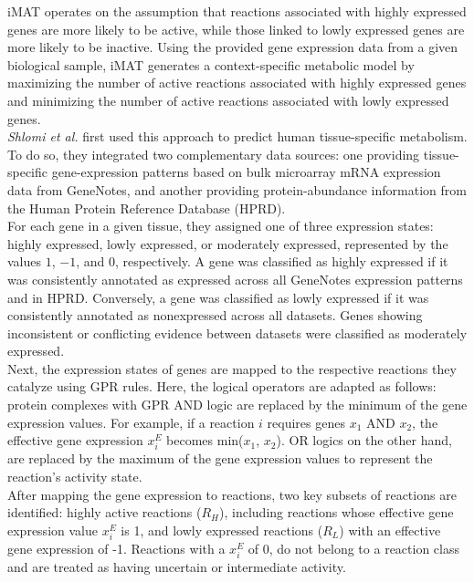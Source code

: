 iMAT operates on the assumption that reactions associated with highly expressed genes are more likely to be active, while those linked to lowly expressed genes are more likely to be inactive. Using the provided gene expression data from a given biological sample, iMAT generates a context-specific metabolic model by maximizing the number of active reactions associated with highly expressed genes and minimizing the number of active reactions associated with lowly expressed genes.
\\

\textit{Shlomi et al.} first used this approach to predict human tissue-specific metabolism. To do so, they integrated two complementary data sources: one providing tissue-specific gene-expression patterns based on bulk microarray mRNA expression data from GeneNotes, and another providing protein-abundance information from the Human Protein Reference Database (HPRD). 
\\
For each gene in a given tissue, they assigned one of three expression states: highly expressed, lowly expressed, or moderately expressed, represented by the values $1$, $-1$, and $0$, respectively. 
A gene was classified as highly expressed if it was consistently annotated as expressed across all GeneNotes expression patterns and in HPRD. Conversely, a gene was classified as lowly expressed if it was consistently annotated as nonexpressed across all datasets. 
Genes showing inconsistent or conflicting evidence between datasets were classified as moderately expressed.  
\\

Next, the expression states of genes are mapped to the respective reactions they catalyze using GPR rules. Here, the logical operators are adapted as follows: protein complexes with  GPR AND logic are replaced by the minimum of the gene expression values. For example, if a reaction $i$
requires genes $x_1$ AND $x_2$,  the effective gene expression $x_i^E$ becomes min($x_1$, $x_2$). 
OR logics on the other hand, are replaced by the maximum of the gene expression values to represent the reaction’s activity state.
\\

After mapping the gene expression to reactions, two key subsets of reactions are identified: highly active reactions ($R_H$), including reactions whose effective gene expression value $x_i^E$ is 1,
and lowly expressed reactions ($R_L$) with an effective gene expression of -1. Reactions with a $x_i^E$ of 0, do not belong
to a reaction class and are treated as having uncertain or intermediate activity.
\\

